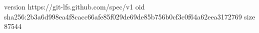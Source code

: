 version https://git-lfs.github.com/spec/v1
oid sha256:2b3a6d998ea4f8cacc66afe85f029de69de85b756b0cf3c0f64a62eea3172769
size 87544
